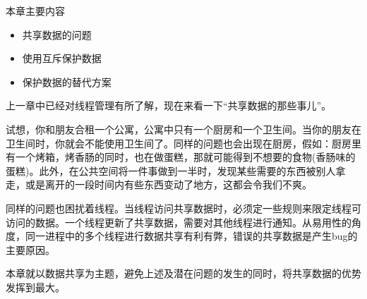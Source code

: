 
本章主要内容

\begin{itemize}
    \item 共享数据的问题
    \item 使用互斥保护数据
    \item 保护数据的替代方案
\end{itemize}

上一章中已经对线程管理有所了解，现在来看一下“共享数据的那些事儿”。

试想，你和朋友合租一个公寓，公寓中只有一个厨房和一个卫生间。当你的朋友在卫生间时，你就会不能使用卫生间了。同样的问题也会出现在厨房，假如：厨房里有一个烤箱，烤香肠的同时，也在做蛋糕，那就可能得到不想要的食物(香肠味的蛋糕)。此外，在公共空间将一件事做到一半时，发现某些需要的东西被别人拿走，或是离开的一段时间内有些东西变动了地方，这都会令我们不爽。

同样的问题也困扰着线程。当线程访问共享数据时，必须定一些规则来限定线程可访问的数据。一个线程更新了共享数据，需要对其他线程进行通知。从易用性的角度，同一进程中的多个线程进行数据共享有利有弊，错误的共享数据是产生bug的主要原因。

本章就以数据共享为主题，避免上述及潜在问题的发生的同时，将共享数据的优势发挥到最大。